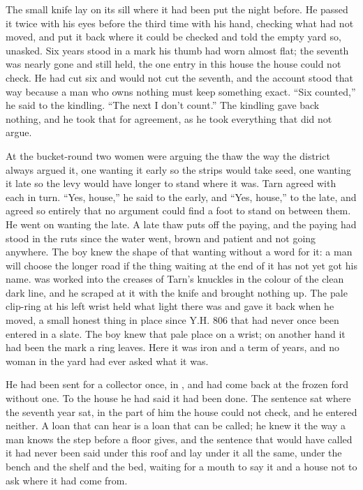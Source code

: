 The small knife lay on its sill where it had been put the night before. He passed it twice with his eyes before the third time with his hand, checking what had not moved, and put it back where it could be checked and told the empty yard so, unasked. Six years stood in a mark his thumb had worn almost flat; the seventh was nearly gone and still held, the one entry in this house the house could not check. He had cut six and would not cut the seventh, and the account stood that way because a man who owns nothing must keep something exact. “Six counted,” he said to the kindling. “The next I don't count.” The kindling gave back nothing, and he took that for agreement, as he took everything that did not argue.

At the bucket-round two women were arguing the thaw the way the district always argued it, one wanting it early so the strips would take seed, one wanting it late so the levy would have longer to stand where it was. Tarn agreed with each in turn. “Yes, house,” he said to the early, and “Yes, house,” to the late, and agreed so entirely that no argument could find a foot to stand on between them. He went on wanting the late. A late thaw puts off the paying, and the paying had stood in the ruts since the water went, brown and patient and not going anywhere. The boy knew the shape of that wanting without a word for it: a man will choose the longer road if the thing waiting at the end of it has not yet got his name.  was worked into the creases of Tarn's knuckles in the colour of the clean dark line, and he scraped at it with the knife and brought nothing up. The pale clip-ring at his left wrist held what light there was and gave it back when he moved, a small honest thing in place since Y.H. 806 that had never once been entered in a slate. The boy knew that pale place on a wrist; on another hand it had been the mark a ring leaves. Here it was iron and a term of years, and no woman in the yard had ever asked what it was.

He had been sent for a collector once, in , and had come back at the frozen ford without one. To the house he had said it had been done. The sentence sat where the seventh year sat, in the part of him the house could not check, and he entered neither. A loan that can hear is a loan that can be called; he knew it the way a man knows the step before a floor gives, and the sentence that would have called it had never been said under this roof and lay under it all the same, under the bench and the shelf and the bed, waiting for a mouth to say it and a house not to ask where it had come from.

